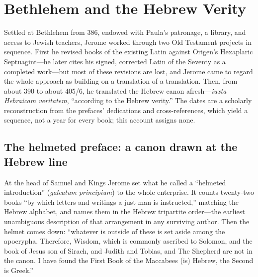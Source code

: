 \section{Bethlehem and the Hebrew Verity}

Settled at Bethlehem from 386, endowed with Paula's patronage, a library,
and access to Jewish teachers, Jerome worked through two Old Testament
projects in sequence. First he revised books of the existing Latin against
Origen's Hexaplaric Septuagint---he later cites his signed, corrected
Latin of the Seventy as a completed work---but most of these revisions are
lost, and Jerome came to regard the whole approach as building on a
translation of a translation. Then, from about 390 to about 405/6, he translated the
Hebrew canon afresh---\textit{iuxta Hebraicam veritatem}, ``according to
the Hebrew verity.'' The dates are a scholarly reconstruction from the
prefaces' dedications and cross-references, which yield a sequence, not a
year for every book; this account assigns none.

\subsection{The helmeted preface: a canon drawn at the Hebrew line}

At the head of Samuel and Kings Jerome set what he called a ``helmeted
introduction'' (\textit{galeatum principium}) to the whole enterprise. It
counts twenty-two books ``by which letters and writings a just man is
instructed,'' matching the Hebrew alphabet, and names them in the Hebrew
tripartite order---the earliest unambiguous description of that
arrangement in any surviving author. Then the helmet comes down:
``whatever is outside of these is set aside among the apocrypha.
Therefore, Wisdom, which is commonly ascribed to Solomon, and the book of
Jesus son of Sirach, and Judith and Tobias, and The Shepherd are not in
the canon. I have found the First Book of the Maccabees (is) Hebrew, the
Second is Greek.''

